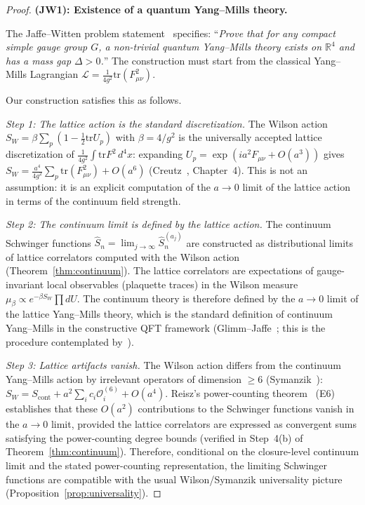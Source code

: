 \documentclass[11pt]{article}
\theoremstyle{definition}
\newcommand{\tr}{\mathrm{tr}}
\newcommand{\R}{\mathbb{R}}
\begin{document}
\begin{proof}
\textbf{(JW1): Existence of a quantum Yang--Mills theory.}

The Jaffe--Witten problem statement~\cite{JaffeWitten} specifies:
``\emph{Prove that for any compact simple gauge group $G$,
a non-trivial quantum Yang--Mills theory exists on $\R^4$
and has a mass gap $\Delta>0$.}''
The construction must start from the classical Yang--Mills
Lagrangian $\mathcal{L}=\frac{1}{4g^2}\tr(F_{\mu\nu}^2)$.

Our construction satisfies this as follows.

\emph{Step 1: The lattice action is the standard discretization.}
The Wilson action
$S_W=\beta\sum_p(1-\frac{1}{2}\tr U_p)$ with
$\beta=4/g^2$ is the universally accepted lattice
discretization of $\frac{1}{4g^2}\int\tr F^2\,d^4x$:
expanding $U_p=\exp(ia^2 F_{\mu\nu}+O(a^3))$ gives
$S_W=\frac{a^4}{4g^2}\sum_p\tr(F_{\mu\nu}^2)+O(a^6)$
(Creutz~\cite{Creutz}, Chapter~4).
This is not an assumption: it is an explicit
computation of the $a\to 0$ limit of the lattice action
in terms of the continuum field strength.

\emph{Step 2: The continuum limit is defined by the lattice action.}
The continuum Schwinger functions
$\hat S_n=\lim_{j\to\infty}\hat S_n^{(a_j)}$ are
constructed as distributional limits of lattice correlators
computed with the Wilson action (Theorem~\ref{thm:continuum}).
The lattice correlators are expectations of gauge-invariant
local observables (plaquette traces) in the Wilson measure
$\mu_\beta\propto e^{-\beta S_W}\prod dU$.
The continuum theory is therefore defined by the $a\to 0$
limit of the lattice Yang--Mills theory, which is the
standard definition of continuum Yang--Mills in the
constructive QFT framework
(Glimm--Jaffe~\cite{GlimmJaffe}; this is the procedure
contemplated by~\cite{JaffeWitten}).

\emph{Step 3: Lattice artifacts vanish.}
The Wilson action differs from the continuum Yang--Mills
action by irrelevant operators of dimension $\ge 6$
(Symanzik~\cite{Symanzik75}):
$S_W=S_{\mathrm{cont}}+a^2\sum_i c_i\mathcal{O}_i^{(6)}
+O(a^4)$.
Reisz's power-counting theorem~\cite{Reisz1988} (E6)
establishes that these $O(a^2)$ contributions to the
Schwinger functions vanish in the $a\to 0$ limit,
provided the lattice correlators are expressed as
convergent sums satisfying the power-counting
degree bounds (verified in Step~4(b) of
Theorem~\ref{thm:continuum}).
Therefore, conditional on the closure-level continuum limit and the stated power-counting representation, the limiting Schwinger functions are compatible with the usual Wilson/Symanzik universality picture (Proposition~\ref{prop:universality}).


\end{proof}
\end{document}
